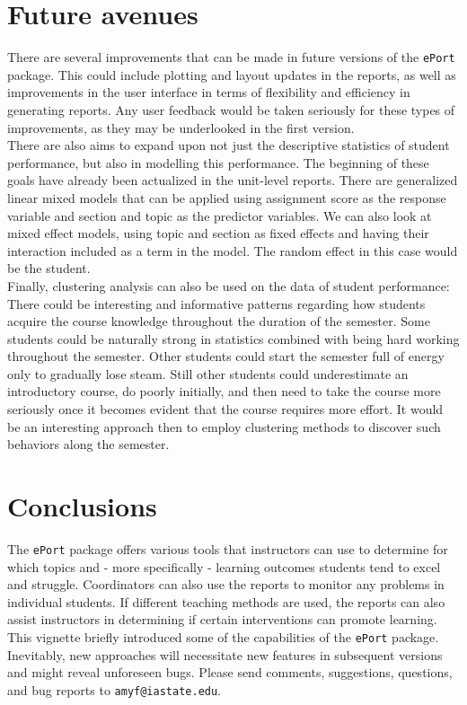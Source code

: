 \documentclass{article}\usepackage[]{graphicx}\usepackage[]{color}
\numberwithin{equation}{section} %
\newcommand{\pkg}[1]{{\texttt{#1}}}
\begin{document}
\section{Future avenues}

There are several improvements that can be made in future versions of the \texttt{ePort} package. This could include plotting and layout updates in the reports, as well as improvements in the user interface in terms of flexibility and efficiency in generating reports. Any user feedback would be taken seriously for these types of improvements, as they may be underlooked in the first version.\\

There are also aims to expand upon not just the descriptive statistics of student performance, but also in modelling this performance. The beginning of these goals have already been actualized in the unit-level reports. There are generalized linear mixed models that can be applied using assignment score as the response variable and section and topic as the predictor variables. We can also look at mixed effect models, using topic and section as fixed effects and having their interaction included as a term in the model. The random effect in this case would be the student.\\

Finally, clustering analysis can also be used on the data of student performance: There could be interesting and informative patterns regarding how students acquire the course knowledge throughout the duration of the semester. Some students could be naturally strong in statistics combined with being hard working throughout the semester. Other students could start the semester full of energy only to gradually lose steam. Still other students could underestimate an introductory course, do poorly initially, and then need to take the course more seriously once it becomes evident that the course requires more effort. It would be an interesting approach then to employ clustering methods to discover such behaviors along the semester.\\

\section{Conclusions}

The \pkg{ePort} package offers various tools that instructors can use to determine for which topics and - more specifically - learning outcomes students tend to excel and struggle. Coordinators can also use the reports to monitor any problems in individual students. If different teaching methods are used, the reports can also assist instructors in determining if certain interventions can promote learning.\\

This vignette briefly introduced some of the capabilities of the \pkg{ePort} package. Inevitably, new approaches will necessitate new features in subsequent versions and might reveal unforeseen bugs. Please send comments, suggestions, questions, and bug reports to \texttt{amyf@iastate.edu}.
\end{document}
